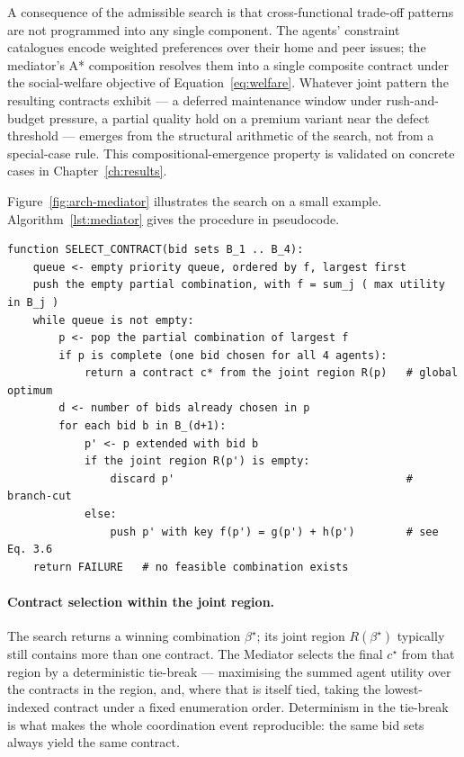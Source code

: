 A consequence of the admissible search is that cross-functional
trade-off patterns are not programmed into any single component. The
agents' constraint catalogues encode weighted preferences over their
home and peer issues; the mediator's A* composition resolves them into
a single composite contract under the social-welfare objective of
Equation~\eqref{eq:welfare}. Whatever joint pattern the resulting
contracts exhibit --- a deferred maintenance window under
rush-and-budget pressure, a partial quality hold on a premium variant
near the defect threshold --- emerges from the structural arithmetic of
the search, not from a special-case rule. This compositional-emergence
property is validated on concrete cases in Chapter~\ref{ch:results}.

Figure~\ref{fig:arch-mediator} illustrates the search on a small
example. Algorithm~\ref{lst:mediator} gives the procedure in pseudocode.


\begin{lstlisting}[caption={The mediator's branch-cut A* search
(pseudocode). The priority key f = g + h is Equation~(3.6).},label={lst:mediator}]
function SELECT_CONTRACT(bid sets B_1 .. B_4):
    queue <- empty priority queue, ordered by f, largest first
    push the empty partial combination, with f = sum_j ( max utility in B_j )
    while queue is not empty:
        p <- pop the partial combination of largest f
        if p is complete (one bid chosen for all 4 agents):
            return a contract c* from the joint region R(p)   # global optimum
        d <- number of bids already chosen in p
        for each bid b in B_(d+1):
            p' <- p extended with bid b
            if the joint region R(p') is empty:
                discard p'                                    # branch-cut
            else:
                push p' with key f(p') = g(p') + h(p')        # see Eq. 3.6
    return FAILURE   # no feasible combination exists
\end{lstlisting}

\paragraph{Contract selection within the joint region.}
The search returns a winning combination $\beta^{\star}$; its joint
region $R(\beta^{\star})$ typically still contains more than one
contract. The Mediator selects the final $c^{\star}$ from that region by
a deterministic tie-break --- maximising the summed agent utility over
the contracts in the region, and, where that is itself tied, taking the
lowest-indexed contract under a fixed enumeration order. Determinism in
the tie-break is what makes the whole coordination event reproducible:
the same bid sets always yield the same contract.

